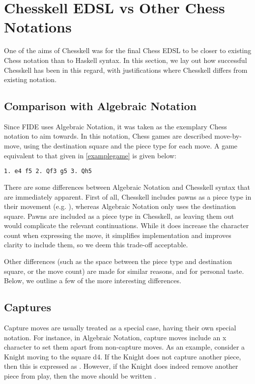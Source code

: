 \section{Chesskell EDSL vs Other Chess Notations}

One of the aims of Chesskell was for the final Chess EDSL to be closer to existing Chess notation than to Haskell syntax. In this section, we lay out how successful Chesskell has been in this regard, with justifications where Chesskell differs from existing notation.

\subsection{Comparison with Algebraic Notation}

Since FIDE uses Algebraic Notation, it was taken as the exemplary Chess notation to aim towards. In this notation, Chess games are described move-by-move, using the destination square and the piece type for each move. A game equivalent to that given in \cref{examplegame} is given below:

\begin{verbatim}
1. e4 f5 2. Qf3 g5 3. Qh5
\end{verbatim}

There are some differences between Algebraic Notation and Chesskell syntax that are immediately apparent. First of all, Chesskell includes pawns as a piece type in their movement (e.g. ), whereas Algebraic Notation only uses the destination square. Pawns are included as a piece type in Chesskell, as leaving them out would complicate the relevant continuations. While it does increase the character count when expressing the move, it simplifies implementation and improves clarity to include them, so we deem this trade-off acceptable.

Other differences (such as the space between the piece type and destination square, or the move count) are made for similar reasons, and for personal taste. Below, we outline a few of the more interesting differences.

\subsection{Captures}

Capture moves are usually treated as a special case, having their own special notation. For instance, in Algebraic Notation, capture moves include an x character to set them apart from non-capture moves. As an example, consider a Knight moving to the square d4. If the Knight does not capture another piece, then this is expressed as . However, if the Knight does indeed remove another piece from play, then the move should be written .

